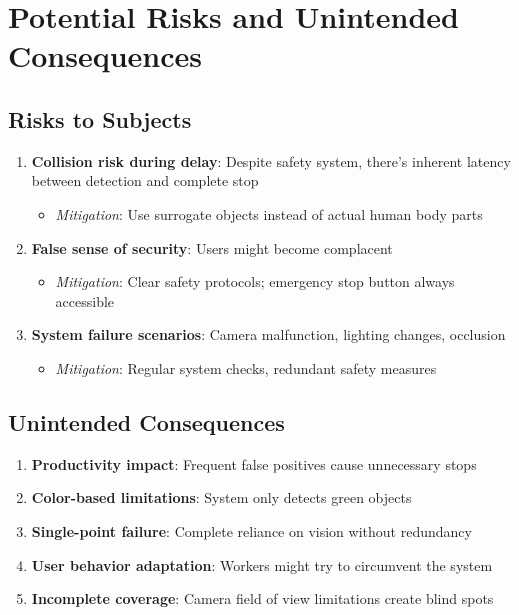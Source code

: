 \documentclass[11pt,letterpaper]{article}
\begin{document}
\section{Potential Risks and Unintended Consequences}

\subsection{Risks to Subjects}

\begin{enumerate}[leftmargin=*]
    \item \textbf{Collision risk during delay}: Despite safety system, there's inherent latency between detection and complete stop
    \begin{itemize}
        \item \textit{Mitigation}: Use surrogate objects instead of actual human body parts
    \end{itemize}
    
    \item \textbf{False sense of security}: Users might become complacent
    \begin{itemize}
        \item \textit{Mitigation}: Clear safety protocols; emergency stop button always accessible
    \end{itemize}
    
    \item \textbf{System failure scenarios}: Camera malfunction, lighting changes, occlusion
    \begin{itemize}
        \item \textit{Mitigation}: Regular system checks, redundant safety measures
    \end{itemize}
\end{enumerate}

\subsection{Unintended Consequences}

\begin{enumerate}[leftmargin=*]
    \item \textbf{Productivity impact}: Frequent false positives cause unnecessary stops
    \item \textbf{Color-based limitations}: System only detects green objects
    \item \textbf{Single-point failure}: Complete reliance on vision without redundancy
    \item \textbf{User behavior adaptation}: Workers might try to circumvent the system
    \item \textbf{Incomplete coverage}: Camera field of view limitations create blind spots
\end{enumerate}
\end{document}
